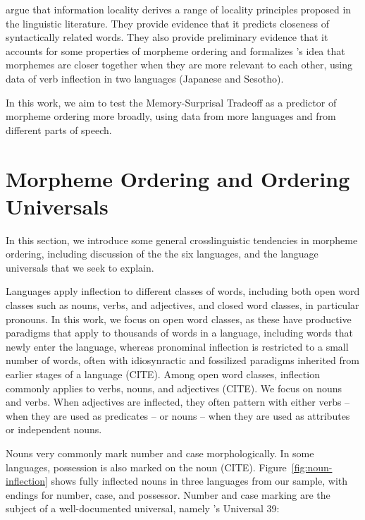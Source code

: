 \documentclass[11pt,letterpaper]{article}
\begin{document}
\citet{Hahn2020modeling} argue that information locality derives a range of locality principles proposed in the linguistic literature.
They provide evidence that it predicts closeness of syntactically related words.
They also provide preliminary evidence that it accounts for some properties of morpheme ordering and formalizes \cite{bybee-morphology-1985}'s idea that morphemes are closer together when they are more relevant to each other, using data of verb inflection in two languages (Japanese and Sesotho).

In this work, we aim to test the Memory-Surprisal Tradeoff as a predictor of morpheme ordering more broadly, using data from more languages and from different parts of speech.



\section{Morpheme Ordering and Ordering Universals}

In this section, we introduce some general crosslinguistic tendencies in morpheme ordering, including discussion of the the six languages, and the language universals that we seek to explain.

Languages apply inflection to different classes of words, including both open word classes such as nouns, verbs, and adjectives, and closed word classes, in particular pronouns.
In this work, we focus on open word classes, as these have productive paradigms that apply to thousands of words in a language, including words that newly enter the language, whereas pronominal inflection is restricted to a small number of words, often with idiosynractic and fossilized paradigms inherited from earlier stages of a language (CITE).
Among open word classes, inflection commonly applies to verbs, nouns, and adjectives (CITE).
We focus on nouns and verbs.
When adjectives are inflected, they often pattern with either verbs -- when they are used as predicates -- or nouns -- when they are used as attributes or independent nouns.

Nouns very commonly mark number and case morphologically.
In some languages, possession is also marked on the noun (CITE).
Figure~\ref{fig:noun-inflection} shows fully inflected nouns in three languages from our sample, with endings for number, case, and possessor.
Number and case marking are the subject of a well-documented universal, namely \citep{greenberg1963universals}'s Universal 39:
\end{document}
